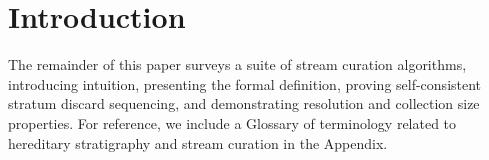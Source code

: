 \section{Introduction} \label{sec:introduction}


% 


\sectionbreak

The remainder of this paper surveys a suite of stream curation algorithms, introducing intuition, presenting the formal definition, proving self-consistent stratum discard sequencing, and demonstrating resolution and collection size properties.
For reference, we include a Glossary of terminology related to hereditary stratigraphy and stream curation in the Appendix.
